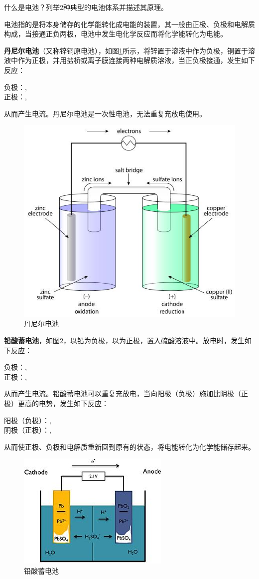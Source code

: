 \documentclass{assignment}
\begin{document}
\begin{ti}
    什么是电池？列举2种典型的电池体系并描述其原理。
\end{ti}
\begin{da}
    电池指的是将本身储存的化学能转化成电能的装置，其一般由正极、负极和电解质构成，当接通正负两极，电池中发生电化学反应而将化学能转化为电能。

    \textbf{丹尼尔电池}（又称锌铜原电池），如图\ref{Daniell}所示，将锌置于溶液中作为负极，铜置于溶液中作为正极，并用盐桥或离子膜连接两种电解质溶液，当正负极接通，发生如下反应：
    \begin{center}
        负极：,\\
        正极：,
    \end{center}
    从而产生电流。丹尼尔电池是一次性电池，无法重复充放电使用。
    \begin{figure}[h]
        \centering
        \includegraphics[width=.25\columnwidth]{DaniellBattery.jpg}
        \caption{丹尼尔电池}
        \label{Daniell}
    \end{figure}

    \textbf{铅酸蓄电池}，如图\ref{Lead-acid}，以铅为负极，以为正极，置入硫酸溶液中。放电时，发生如下反应：
    \begin{center}
        负极：,\\
        正极：,
    \end{center}
    从而产生电流。铅酸蓄电池可以重复充放电，当向阳极（负极）施加比阴极（正极）更高的电势，发生如下反应：
    \begin{center}
        阳极（负极）：,\\
        阴极（正极）：,
    \end{center}
    从而使正极、负极和电解质重新回到原有的状态，将电能转化为化学能储存起来。
    \begin{figure}[h]
        \centering
        \includegraphics[width=.25\columnwidth]{Lead-acidBattery.jpg}
        \caption{铅酸蓄电池}
        \label{Lead-acid}
    \end{figure}
\end{da}
\end{document}
